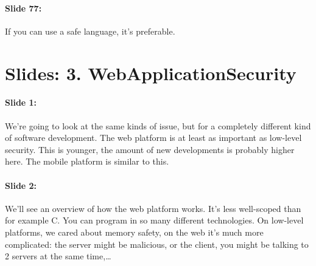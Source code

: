 \documentclass[10pt,a4paper]{report}
\begin{document}
\paragraph{Slide 77:} If you can use a safe language, it's preferable.

\section{Slides: 3. WebApplicationSecurity}

\paragraph{Slide 1:} We're going to look at the same kinds of issue, but for a completely different kind of software development. The web platform is at least as important as low-level security. 
This is younger, the amount of new developments is probably higher here. The mobile platform is similar to this.

\paragraph{Slide 2:} We'll see an overview of how the web platform works. It's less well-scoped than for example C. You can program in so many different technologies. On low-level platforms, we cared about memory safety, on the web it's much more complicated: the server might be malicious, or the client, you might be talking to 2 servers at the same time,…
\end{document}
